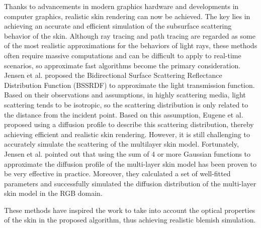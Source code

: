 \begin{spacing}{1.5}
Thanks to advancements in modern graphics hardware and developments in computer graphics, realistic skin rendering can now be achieved\cite{10.1145/1198555.1198593, 2015ExtendingTD, JIMENEZ2015_CGF}. The key lies in achieving an accurate and efficient simulation of the subsurface scattering behavior of the skin. Although ray tracing and path tracing\cite{wrenninge2017path, chiang2016practical} are regarded as some of the most realistic approximations for the behaviors of light rays, these methods often require massive computations and can be difficult to apply to real-time scenarios, so approximate fast algorithms become the primary consideration. Jensen et al.\cite{10.1145/3596711.3596747} proposed the Bidirectional Surface Scattering Reflectance Distribution Function (BSSRDF) to approximate the light transmission function. Based on their observations and assumptions, in highly scattering media, light scattering tends to be isotropic, so the scattering distribution is only related to the distance from the incident point. Based on this assumption, Eugene et al.\cite{d2007efficient} proposed using a diffusion profile to describe this scattering distribution, thereby achieving efficient and realistic skin rendering. However, it is still challenging to accurately simulate the scattering of the multilayer skin model. Fortunately, Jensen et al.\cite{10.1145/1073204.1073308} pointed out that using the sum of 4 or more Gaussian functions to approximate the diffusion profile of the multi-layer skin model has been proven to be very effective in practice. Moreover, they calculated a set of well-fitted parameters and successfully simulated the diffusion distribution of the multi-layer skin model in the RGB domain.

These methods have inspired the work to take into account the optical properties of the skin in the proposed algorithm, thus achieving realistic blemish simulation.





\end{spacing}
